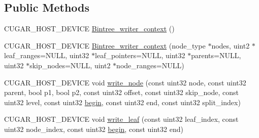 \subsection*{Public Methods}
\begin{DoxyCompactItemize}
\item 
C\+U\+G\+A\+R\+\_\+\+H\+O\+S\+T\+\_\+\+D\+E\+V\+I\+CE \hyperlink{structcugar_1_1_bintree__writer__context_3_01node__type_00_01leaf__range__tag_01_4_a4c66b82eca04d8b387f561c7855215d5}{Bintree\+\_\+writer\+\_\+context} ()
\item 
C\+U\+G\+A\+R\+\_\+\+H\+O\+S\+T\+\_\+\+D\+E\+V\+I\+CE \hyperlink{structcugar_1_1_bintree__writer__context_3_01node__type_00_01leaf__range__tag_01_4_a5eb3bf7d79e7a2e16621cf73fe0c1e44}{Bintree\+\_\+writer\+\_\+context} (node\+\_\+type $\ast$nodes, uint2 $\ast$leaf\+\_\+ranges=N\+U\+LL, uint32 $\ast$leaf\+\_\+pointers=N\+U\+LL, uint32 $\ast$parents=N\+U\+LL, uint32 $\ast$skip\+\_\+nodes=N\+U\+LL, uint2 $\ast$node\+\_\+ranges=N\+U\+LL)
\item 
C\+U\+G\+A\+R\+\_\+\+H\+O\+S\+T\+\_\+\+D\+E\+V\+I\+CE void \hyperlink{structcugar_1_1_bintree__writer__context_3_01node__type_00_01leaf__range__tag_01_4_a4516c47393197c70d5179c471917b01f}{write\+\_\+node} (const uint32 node, const uint32 parent, bool p1, bool p2, const uint32 offset, const uint32 skip\+\_\+node, const uint32 level, const uint32 \hyperlink{namespacecugar_a2121df08f967e232ea5fe0ee378dee67}{begin}, const uint32 end, const uint32 split\+\_\+index)
\item 
C\+U\+G\+A\+R\+\_\+\+H\+O\+S\+T\+\_\+\+D\+E\+V\+I\+CE void \hyperlink{structcugar_1_1_bintree__writer__context_3_01node__type_00_01leaf__range__tag_01_4_a344908507094f704f0de59b9050ca302}{write\+\_\+leaf} (const uint32 leaf\+\_\+index, const uint32 node\+\_\+index, const uint32 \hyperlink{namespacecugar_a2121df08f967e232ea5fe0ee378dee67}{begin}, const uint32 end)
\end{DoxyCompactItemize}
